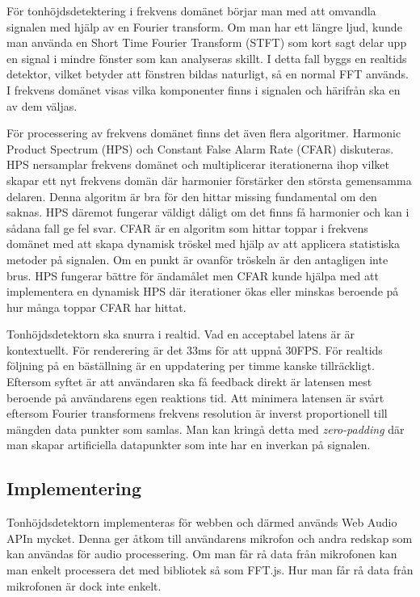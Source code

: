 För tonhöjdsdetektering i frekvens domänet börjar man med att omvandla signalen med hjälp av en Fourier transform. Om man har ett längre ljud, kunde man använda en Short Time Fourier Transform (STFT) som kort sagt delar upp en signal i mindre fönster som kan analyseras skillt. I detta fall byggs en realtids detektor, vilket betyder att fönstren bildas naturligt, så en normal FFT används. I frekvens domänet visas vilka komponenter finns i signalen och härifrån ska en av dem väljas.

För processering av frekvens domänet finns det även flera algoritmer. Harmonic Product Spectrum (HPS) och Constant False Alarm Rate (CFAR) diskuteras. HPS nersamplar frekvens domänet och multiplicerar iterationerna ihop vilket skapar ett nyt frekvens domän där harmonier förstärker den största gemensamma delaren. Denna algoritm är bra för den hittar missing fundamental om den saknas. HPS däremot fungerar väldigt dåligt om det finns få harmonier och kan i sådana fall ge fel svar. CFAR är en algoritm som hittar toppar i frekvens domänet med att skapa dynamisk tröskel med hjälp av att applicera statistiska metoder på signalen. Om en punkt är ovanför tröskeln är den antagligen inte brus. HPS fungerar bättre för ändamålet men CFAR kunde hjälpa med att implementera en dynamisk HPS där iterationer ökas eller minskas beroende på hur många toppar CFAR har hittat. 

Tonhöjdsdetektorn ska snurra i realtid. Vad en acceptabel latens är är kontextuellt. För renderering är det 33ms för att uppnå 30FPS. För realtids följning på en bäställning är en uppdatering per timme kanske tillräckligt. Eftersom syftet är att användaren ska få feedback direkt är latensen mest beroende på användarens egen reaktions tid. Att minimera latensen är svårt eftersom Fourier transformens frekvens resolution är inverst proportionell till mängden data punkter som samlas. Man kan kringå detta med \textit{zero-padding} där man skapar artificiella datapunkter som inte har en inverkan på signalen. 
\subsection*{Implementering}
Tonhöjdsdetektorn implementeras för webben och därmed används Web Audio APIn mycket. Denna ger åtkom till användarens mikrofon och andra redskap som kan användas för audio processering. Om man får rå data från mikrofonen kan man enkelt processera det med bibliotek så som FFT.js. Hur man får rå data från mikrofonen är dock inte enkelt. 

